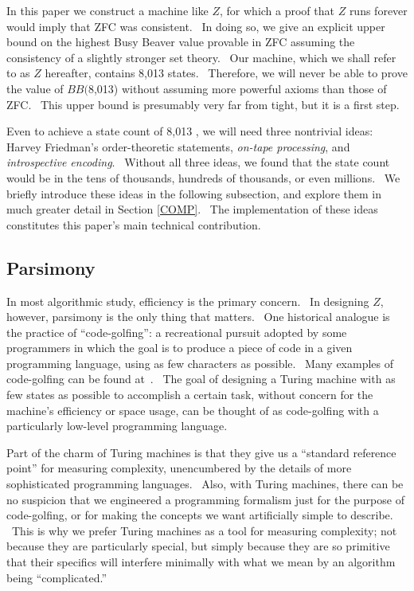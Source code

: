 \documentclass[11pt]{article}
\newcommand{\statenum}{8,013 }
\newcommand{\bbstatenum}{$BB($8,013) }
\begin{document}
In this paper we construct a machine like $Z$, for which a proof that $Z$ runs forever would imply that ZFC was consistent. \ In doing so, we give an explicit upper bound on the highest Busy Beaver value provable in ZFC assuming the consistency of a slightly stronger set theory. \ Our machine, which we shall refer to as $Z$ hereafter, contains \statenum states. \ Therefore, we will never be able to prove the value of \bbstatenum without assuming more powerful axioms than those of ZFC. \ This upper bound is presumably very far from tight, but it is a first step.

Even to achieve a state count of \statenum, we will need three nontrivial ideas: Harvey Friedman's order-theoretic statements, \emph{on-tape processing}, and \emph{introspective encoding}. \ Without all three ideas, we found that the state count would be in the tens of thousands, hundreds of thousands, or even millions. \ We briefly introduce these ideas in the following subsection, and explore them in much greater detail in Section \ref{COMP}. \ The implementation of these ideas constitutes this paper's main technical contribution.

\subsection{Parsimony}

In most algorithmic study, efficiency is the primary concern. \ In designing $Z$, however, parsimony is the only thing that matters. \ One historical analogue is the practice of ``code-golfing'': a recreational pursuit adopted by some programmers in which the goal is to produce a piece of code in a given programming language, using as few characters as possible. \ Many examples of code-golfing can be found at~\cite{codegolf}. \ The goal of designing a Turing machine with as few states as possible to accomplish a certain task, without concern for the machine's efficiency or space usage, can be thought of as code-golfing with a particularly low-level programming language.

Part of the charm of Turing machines is that they give us a ``standard reference point'' for measuring complexity, unencumbered by the details of more sophisticated programming languages. \ Also, with Turing machines, there can be no suspicion that we engineered a programming formalism just for the purpose of code-golfing, or for making the concepts we want artificially simple to describe. \ This is why we prefer Turing machines as a tool for measuring complexity; not because they are particularly special, but simply because they are so primitive that their specifics will interfere minimally with what we mean by an algorithm being ``complicated.''
\end{document}
